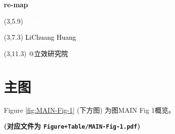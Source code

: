 \documentclass[
]{article}
\author{}
\date{\vspace{-2.5em}}
\begin{document}
\begin{titlepage} 
\begin{center} \textbf{\Huge re-map} \vspace{4em}
\begin{textblock}{10}(3,5.9) \huge
\textbf{\textcolor{white}{2024-06-24}}
\end{textblock} \begin{textblock}{10}(3,7.3)
\Large \textcolor{black}{LiChuang Huang}
\end{textblock} \begin{textblock}{10}(3,11.3)
\Large \textcolor{black}{@立效研究院}
\end{textblock} \end{center} \end{titlepage}
\restoregeometry


\begin{center}\vspace{1.5cm}\end{center}\tableofcontents

\begin{center}\vspace{1.5cm}\end{center}\listoffigures

\begin{center}\vspace{1.5cm}\end{center}\listoftables

\newpage


\hypertarget{abstract}{%
\section{主图}\label{abstract}}

\begin{center}\vspace{1.5cm}\end{center}

Figure \ref{fig:MAIN-Fig-1} (下方图) 为图MAIN Fig 1概览。

\textbf{(对应文件为 \texttt{Figure+Table/MAIN-Fig-1.pdf})}
\end{document}
